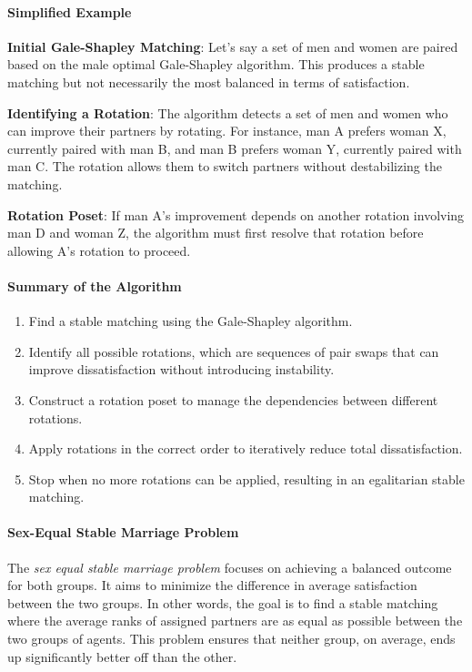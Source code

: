 \paragraph{Simplified Example}

\textbf{Initial Gale-Shapley Matching}: Let’s say a set of men and women are paired based on the male optimal Gale-Shapley algorithm. This produces a stable matching but not necessarily the most balanced in terms of satisfaction.

\textbf{Identifying a Rotation}: The algorithm detects a set of men and women who can improve their partners by rotating. For instance, man A prefers woman X, currently paired with man B, and man B prefers woman Y, currently paired with man C. The rotation allows them to switch partners without destabilizing the matching.

\textbf{Rotation Poset}: If man A’s improvement depends on another rotation involving man D and woman Z, the algorithm must first resolve that rotation before allowing A’s rotation to proceed. 

\paragraph{Summary of the Algorithm}

\begin{enumerate}
    \item Find a stable matching using the Gale-Shapley algorithm.
    \item Identify all possible rotations, which are sequences of pair swaps that can improve dissatisfaction without introducing instability.
    \item Construct a rotation poset to manage the dependencies between different rotations.
    \item Apply rotations in the correct order to iteratively reduce total dissatisfaction.
    \item Stop when no more rotations can be applied, resulting in an egalitarian stable matching.
\end{enumerate}

\paragraph{Sex-Equal Stable Marriage Problem}
The \emph{sex equal stable marriage problem} focuses on achieving a balanced outcome for both groups. It aims to minimize the difference in average satisfaction between the two groups. In other words, the goal is to find a stable matching where the average ranks of assigned partners are as equal as possible between the two groups of agents. This problem ensures that neither group, on average, ends up significantly better off than the other. 

